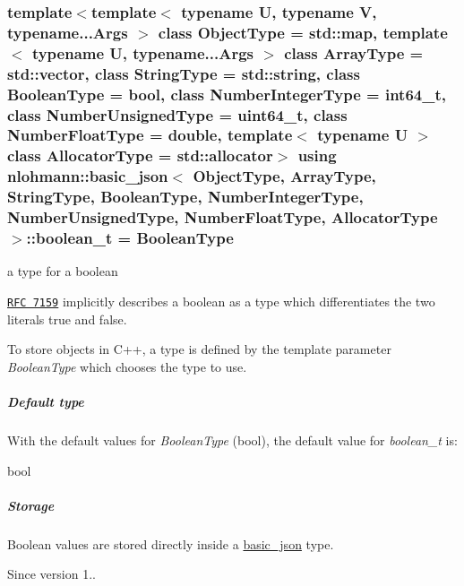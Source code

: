 \subsubsection[{\texorpdfstring{boolean\+\_\+t}{boolean\_t}}]{\setlength{\rightskip}{0pt plus 5cm}template$<$template$<$ typename U, typename V, typename...\+Args $>$ class Object\+Type = std\+::map, template$<$ typename U, typename...\+Args $>$ class Array\+Type = std\+::vector, class String\+Type  = std\+::string, class Boolean\+Type  = bool, class Number\+Integer\+Type  = int64\+\_\+t, class Number\+Unsigned\+Type  = uint64\+\_\+t, class Number\+Float\+Type  = double, template$<$ typename U $>$ class Allocator\+Type = std\+::allocator$>$ using {\bf nlohmann\+::basic\+\_\+json}$<$ Object\+Type, Array\+Type, String\+Type, Boolean\+Type, Number\+Integer\+Type, Number\+Unsigned\+Type, Number\+Float\+Type, Allocator\+Type $>$\+::{\bf boolean\+\_\+t} =  Boolean\+Type}\hypertarget{a00025_af3bc3e83aa162d7ba4df16a949872723}{}\label{a00025_af3bc3e83aa162d7ba4df16a949872723}


a type for a boolean 

\href{http://rfc7159.net/rfc7159}{\tt R\+FC 7159} implicitly describes a boolean as a type which differentiates the two literals {\ttfamily true} and {\ttfamily false}.

To store objects in C++, a type is defined by the template parameter {\itshape Boolean\+Type} which chooses the type to use.

\subparagraph*{Default type}

With the default values for {\itshape Boolean\+Type} ({\ttfamily bool}), the default value for {\itshape boolean\+\_\+t} is\+:


\begin{DoxyCode}
\textcolor{keywordtype}{bool}
\end{DoxyCode}


\subparagraph*{Storage}

Boolean values are stored directly inside a \hyperlink{a00025}{basic\+\_\+json} type.

\begin{DoxySince}{Since}
version 1.. 
\end{DoxySince}
